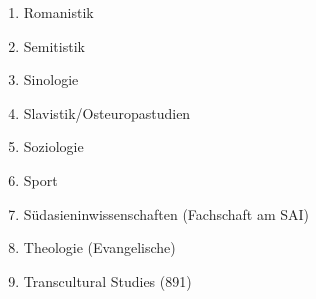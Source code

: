 \begin{enumerate}[noitemsep]
        \item Romanistik                                                                                                                                                                                                  \\
        \item Semitistik                                                                                                                                                                                                  \\
        \item Sinologie                                                                                                                                                                                                   \\
        \item Slavistik/Osteuropastudien                                                                                                                                                                                  \\
        \item Soziologie                                                                                                                                                                                                  \\
        \item Sport                                                                                                                                                                                                       \\
        \item Südasieninwissenschaften (Fachschaft am SAI)                                                                                                                                                                \\
        \item Theologie (Evangelische)                                                                                                                                                                                    \\
        \item Transcultural Studies (891)                                                                                                                                                                                 \\

\end{enumerate}
